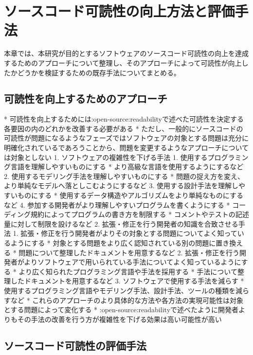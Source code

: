 \chapter{ソースコード可読性の向上方法と評価手法}
\label{readability}

本章では、本研究が目的とするソフトウェアのソースコード可読性の向上を達成するためのアプローチについて整理し、そのアプローチによって可読性が向上したかどうかを検証するための既存手法についてまとめる。

\section{可読性を向上するためのアプローチ}
\label{readability:approach}

* 可読性を向上するためには:open-source:readabilityで述べた可読性を決定する各要因の内のどれかを改善する必要がある
* ただし、一般的にソースコードの可読性が問題になるようなフェーズではソフトウェアの対象とする問題は充分に明確化されているであろうことから、問題を変更するようなアプローチについては対象としない
    1. ソフトウェアの複雑性を下げる手法
        1. 使用するプログラミング言語を理解しやすいものにする
            * より高級な言語を使用するようにするなど
        2. 使用するモデリング手法を理解しやすいものにする
            * 問題の捉え方を変え、より単純なモデルへ落としこむようにするなど
        3. 使用する設計手法を理解しやすいものにする
            * 使用するデータ構造やアルゴリズムをより単純なものにするなど
        4. 参加する開発者がより理解しやすいプログラムを書くようにする
            * コーディング規約によってプログラムの書き方を制限する
            * コメントやテストの記述量に対して制限を設けるなど
    2. 拡張・修正を行う開発者の知識を合致させる手法
        1. 拡張・修正を行う開発者がよりその対象とする問題についてよく知っているようにする
            * 対象とする問題をより広く認知されている別の問題に置き換える
            * 問題について整理したドキュメントを用意するなど
        2. 拡張・修正を行う開発者がよりソフトウェアで用いられている手法についてよく知っているようにする
            * より広く知られたプログラミング言語や手法を採用する
            * 手法について整理したドキュメントを用意するなど
        3. ソフトウェアで使用する手法を減らす
            * 使用するプログラミング言語やモデリング手法、設計手法、ツールの種類を減らすなど
* これらのアプローチのより具体的な方法や各方法の実現可能性は対象とする問題によって変化する
* :open-source:readabilityで述べたように開発者よりもその手法の改善を行う方が複雑性を下げる効果は高い可能性が高い

\section{ソースコード可読性の評価手法}
\label{readability:evaluation}

